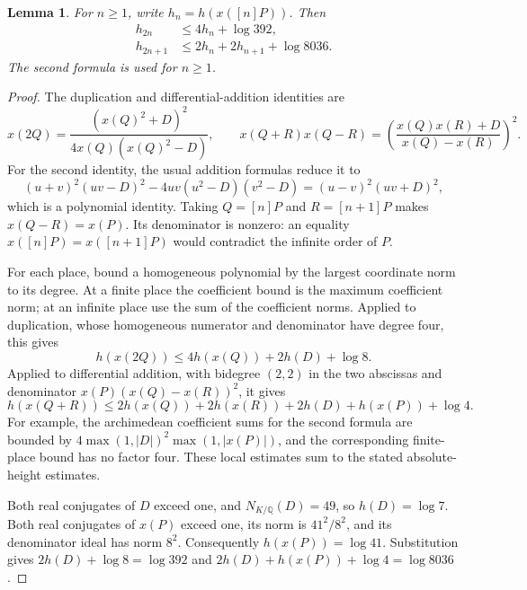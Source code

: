 \documentclass[11pt,a4paper]{article}
\newtheorem{lemma}[theorem]{Lemma}
\begin{document}
\begin{lemma}\label{lem:fixed-height-recurrences}
For $n\ge1$, write $h_n=h(x([n]P))$. Then
\[
 \begin{aligned}
 h_{2n}&\le4h_n+\log392,\\
 h_{2n+1}&\le2h_n+2h_{n+1}+\log8036.
 \end{aligned}
\]
The second formula is used for $n\ge1$.
\end{lemma}
\begin{proof}
The duplication and differential-addition identities are
\[
 x(2Q)=\frac{(x(Q)^2+D)^2}{4x(Q)(x(Q)^2-D)},
 \qquad
 x(Q+R)x(Q-R)=
       \left(\frac{x(Q)x(R)+D}{x(Q)-x(R)}\right)^2.
\]
For the second identity, the usual addition formulas reduce it to
\[
 (u+v)^2(uv-D)^2-4uv(u^2-D)(v^2-D)
                    =(u-v)^2(uv+D)^2,
\]
which is a polynomial identity. Taking $Q=[n]P$ and
$R=[n+1]P$ makes $x(Q-R)=x(P)$. Its denominator is nonzero:
an equality $x([n]P)=x([n+1]P)$ would contradict the infinite
order of $P$.

For each place, bound a homogeneous polynomial by the largest
coordinate norm to its degree. At a finite place the coefficient
bound is the maximum coefficient norm; at an infinite place use
the sum of the coefficient norms. Applied to duplication, whose
homogeneous numerator and denominator have degree four, this gives
\[
             h(x(2Q))\le4h(x(Q))+2h(D)+\log8.
\]
Applied to differential addition, with bidegree $(2,2)$ in the two
abscissas and denominator $x(P)(x(Q)-x(R))^2$, it gives
\[
 h(x(Q+R))\le2h(x(Q))+2h(x(R))+2h(D)+h(x(P))+\log4.
\]
For example, the archimedean coefficient sums for the second
formula are bounded by
$4\max(1,|D|)^2\max(1,|x(P)|)$, and the corresponding finite-place
bound has no factor four. These local estimates sum to the stated
absolute-height estimates.

Both real conjugates of $D$ exceed one, and $N_{K/\mathbb Q}(D)=49$,
so $h(D)=\log7$. Both real conjugates of $x(P)$ exceed one, its
norm is $41^2/8^2$, and its denominator ideal has norm $8^2$.
Consequently $h(x(P))=\log41$. Substitution gives
$2h(D)+\log8=\log392$ and
$2h(D)+h(x(P))+\log4=\log8036$.
\end{proof}
\end{document}
